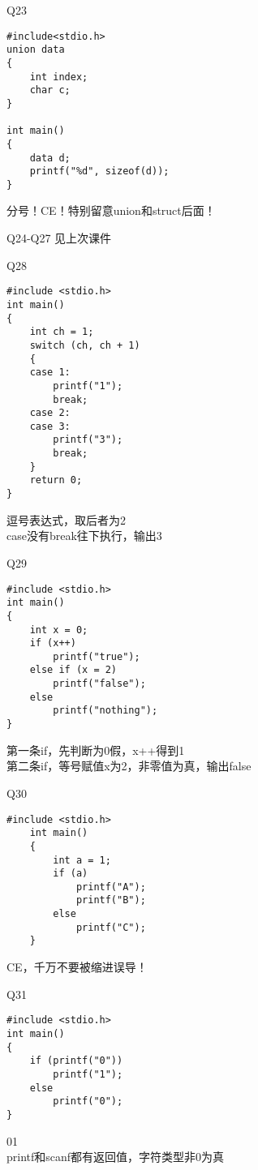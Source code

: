 \documentclass[UTF8]{ctexbeamer}
\begin{document}
\begin{frame}[fragile]{Q23}
\begin{lstlisting}
#include<stdio.h>
union data
{
    int index;
    char c;
}

int main()
{
    data d;
    printf("%d", sizeof(d));
}
\end{lstlisting}
分号！CE！特别留意union和struct后面！
\end{frame}

\begin{frame}{Q24-Q27}
见上次课件
\end{frame}

\begin{frame}[fragile]{Q28}
\begin{lstlisting}
#include <stdio.h>
int main()
{
    int ch = 1;
    switch (ch, ch + 1)
    {
    case 1:
        printf("1");
        break;
    case 2:
    case 3:
        printf("3");
        break;
    }
    return 0;
}
\end{lstlisting}
逗号表达式，取后者为2\\
case没有break往下执行，输出3
\end{frame}

\begin{frame}[fragile]{Q29}
\begin{lstlisting}
#include <stdio.h>
int main()
{
    int x = 0;
    if (x++)
        printf("true");
    else if (x = 2)
        printf("false");
    else
        printf("nothing");
}
\end{lstlisting}
第一条if，先判断为0假，x++得到1\\
第二条if，等号赋值x为2，非零值为真，输出false
\end{frame}

\begin{frame}[fragile]{Q30}
\begin{lstlisting}
#include <stdio.h>
    int main()
    {
        int a = 1;
        if (a)
            printf("A");
            printf("B");
        else
            printf("C");
    }
\end{lstlisting}
CE，千万不要被缩进误导！
\end{frame}

\begin{frame}[fragile]{Q31}
\begin{lstlisting}
#include <stdio.h>
int main()
{
    if (printf("0"))
        printf("1");
    else
    	printf("0");
}
\end{lstlisting}
01\\
printf和scanf都有返回值，字符类型非0为真
\end{frame}
\end{document}
